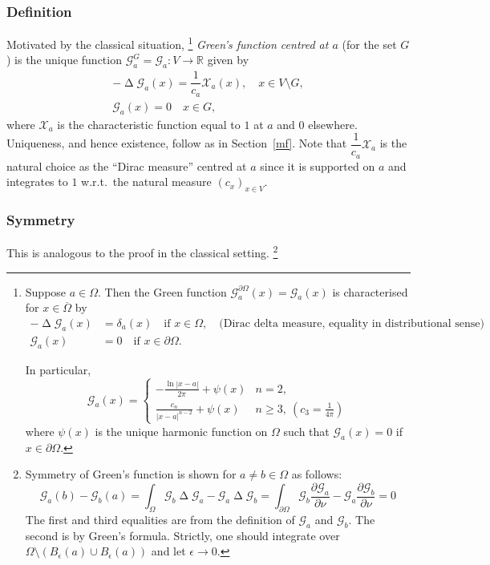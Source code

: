 \documentclass[a4paper]{amsart}
\theoremstyle{plain}
\theoremstyle{definition}
\theoremstyle{remark}
\DeclareMathOperator{\lap}{\Delta}
\begin{document}
\subsubsection{Definition} Motivated by the classical situation,%
\footnote{Suppose $ a \in \Omega $.  Then the Green  function $ \mathcal{G}^{\partial \Omega}_a(x) = \mathcal{G}_a (x )$ is characterised  for $x \in  \overline{\Omega} $ by
\begin{align*}
-\lap \mathcal{G}_a(x) &=    \delta_a(x) \quad  \text{if } x \in  \Omega, \quad \text{(Dirac delta measure, equality in distributional sense)}\\ 
 \mathcal{G}_a(x)& = 0 \quad \text{if } x \in \partial \Omega.
 \end{align*} 
 
 In particular, 
 \[
 \mathcal{G}_a(x) = \begin{cases} -\frac{\ln |x-a| }{2\pi} + \psi(x) & n=2, \\
                                                              \frac{c_n}{|x-a|^{n-2}}  + \psi(x) & n \geq 3, \ (c_3 = \frac{1}{4\pi})
                                                              \end{cases}
                                                              \]
 where $ \psi(x) $ is the unique harmonic function on $ \Omega $ such that $  \mathcal{G}_a(x)  = 0$ if $ x \in \partial \Omega$.
  }
\emph{Green's function centred at $ a $} (for the set $G $)  is the unique function 
$ \mathcal{G}^{G}_a  = \mathcal{G}_a:V\to \mathbb{R}  $ given by
\begin{equation} \label{dfgf}
\begin{gathered}
           \boxed{ -\lap \mathcal{G}_a(x) = \dfrac{1}{c_a} \mathcal{X}_a(x),} \quad x \in V\setminus G,\\
            \mathcal{G}_a(x)  = 0 \quad x \in G,
   \end{gathered}
\end{equation} 
where $ \mathcal{X}_a $ is the characteristic function equal to $ 1 $ at $ a $ and $ 0$  elsewhere.
Uniqueness, and hence existence, follow as in Section~\ref{mf}.
Note that $ \dfrac{1}{c_a} \mathcal{X}_a $ is the natural choice as the ``Dirac measure'' centred at $ a $ since it is supported on $ a $ and integrates to $ 1  $ w.r.t.\ the natural measure $ (c_x)_{x\in V }$.

\subsubsection{Symmetry} This is analogous to the proof in the classical setting.%
\footnote{Symmetry  of Green's function is shown  for $ a\neq b \in \Omega $ as follows:
 \[
 \mathcal{G}_a(b) - \mathcal{G}_b(a) =
 \int_\Omega \mathcal{G}_b \lap \mathcal{G}_a    - \mathcal{G}_a  \lap \mathcal{G}_b 
 = \int_{\partial \Omega}  \mathcal{G}_b   \frac{\partial \mathcal{G}_a }{\partial \nu}
        -       \mathcal{G}_a   \frac{\partial \mathcal{G}_b }{\partial \nu} = 0
        \]
The first and third equalities are  from the definition of $ \mathcal{G}_a $ and $ \mathcal{G}_b $. The second is  by Green's formula.       Strictly, one should integrate over $ \Omega \setminus (B_\epsilon (a) \cup B_\epsilon (a)) $ and let $ \epsilon \to 0 $.
  }
\end{document}
